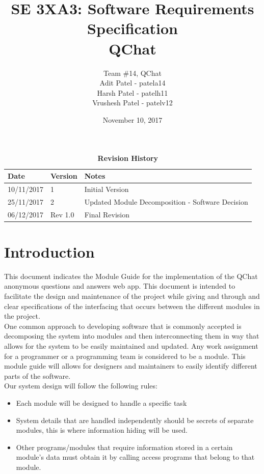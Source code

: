 \documentclass[12pt, titlepage]{article}
\title{SE 3XA3: Software Requirements Specification\\QChat}
\author{Team \#14, QChat
		\\ Adit Patel - patela14
		\\ Harsh Patel - patelh11
		\\ Vrushesh Patel - patelv12
}
\date{November 10, 2017}
\begin{document}
\maketitle

\tableofcontents
\listoftables
\listoffigures

\begin{table}[h!]
\caption{\bf Revision History}
\begin{tabularx}{\textwidth}{p{3cm}p{2cm}X}
\toprule {\bf Date} & {\bf Version} & {\bf Notes}\\
\midrule
10/11/2017 & 1 & Initial Version\\
25/11/2017 & 2 & Updated Module Decomposition - Software Decision \\
06/12/2017 & Rev 1.0 & Final Revision \\
\bottomrule
\end{tabularx}
\end{table}

\newpage

\newpage
\section{Introduction}


This document indicates the Module Guide for the implementation of the QChat anonymous questions and answers web app. This document is intended to facilitate the design and maintenance of the project while giving and through and clear specifications of the interfacing that occurs between the different modules in the project.\\

One common approach to developing software that is commonly accepted is decomposing the system into modules and then interconnecting them in way that allows for the system to be easily maintained and updated. Any work assignment for a programmer or a programming team is considered to be a module. This module guide will allows for designers and maintainers to easily identify different parts of the software. \\
 
Our system design will follow the following rules:
\begin{itemize}
\item Each module will be designed to handle a specific task
\item System details that are handled independently should be secrets of separate modules, this is where information hiding will be used.
\item Other programs/modules that require information stored in a certain module’s data must obtain it by calling access programs that belong to that module.
\end{itemize}
\end{document}
